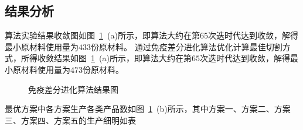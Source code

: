 \documentclass{whutmod}
\begin{document}
  	\subsection{结果分析}
  算法实验结果收敛图如图~\ref{asddadamd}~(a)所示，即算法大约在第$65$次迭时代达到收敛，解得最小原材料使用量为$433$份原材料。
  通过免疫差分进化算法优化计算最佳切割方式，所得收敛结果如图~\ref{asddadamd}~(a)所示，即算法大约在第$65$次迭时代达到收敛，解得最小原材料使用量为$473$份原材料。
 \begin{figure}[H]
 	\centering
 	\label{asdmd}
 	\caption{免疫差分进化算法结果图}\label{asddadamd}
 \end{figure}
 最优方案中各方案生产各类产品数如图~\ref{asddadamd}~(b)所示，其中方案一、方案二、方案三、方案四、方案五的生产细明如表
\end{document}
